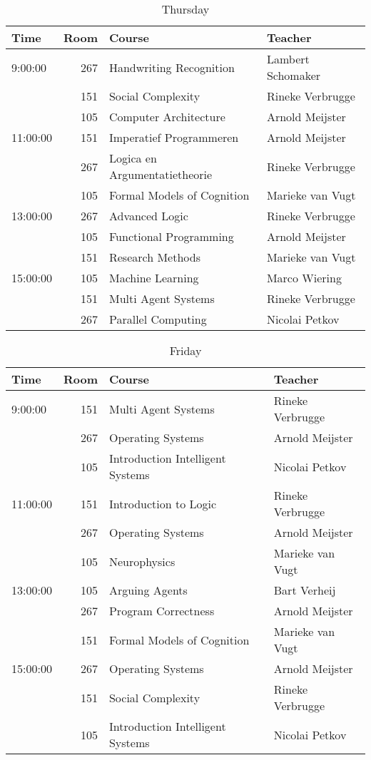 \begin{table}[h]
    \centering
    \caption{Thursday}
    \begin{tabular}{l|r|l|l}
        Time & Room & Course & Teacher \\ \hline
        \hline
        9:00:00 & 267 & Handwriting Recognition & Lambert Schomaker\\
        & 151 & Social Complexity & Rineke Verbrugge\\
        & 105 & Computer Architecture & Arnold Meijster\\\hline
        11:00:00 & 151 & Imperatief Programmeren & Arnold Meijster\\
        & 267 & Logica en Argumentatietheorie & Rineke Verbrugge\\
        & 105 & Formal Models of Cognition & Marieke van Vugt\\\hline
        13:00:00 & 267 & Advanced Logic & Rineke Verbrugge\\
        & 105 & Functional Programming & Arnold Meijster\\
        & 151 & Research Methods & Marieke van Vugt\\\hline
        15:00:00 & 105 & Machine Learning & Marco Wiering\\
        & 151 & Multi Agent Systems & Rineke Verbrugge\\
        & 267 & Parallel Computing & Nicolai Petkov\\
    \end{tabular}
\end{table}

\begin{table}[h]
    \centering
    \caption{Friday}
    \begin{tabular}{l|r|l|l}
        Time & Room & Course & Teacher \\ \hline
        \hline
        9:00:00 & 151 & Multi Agent Systems & Rineke Verbrugge\\
        & 267 & Operating Systems & Arnold Meijster\\
        & 105 & Introduction Intelligent Systems & Nicolai Petkov\\\hline
        11:00:00 & 151 & Introduction to Logic & Rineke Verbrugge\\
        & 267 & Operating Systems & Arnold Meijster\\
        & 105 & Neurophysics & Marieke van Vugt\\\hline
        13:00:00 & 105 & Arguing Agents & Bart Verheij\\
        & 267 & Program Correctness & Arnold Meijster\\
        & 151 & Formal Models of Cognition & Marieke van Vugt\\\hline
        15:00:00 & 267 & Operating Systems & Arnold Meijster\\
        & 151 & Social Complexity & Rineke Verbrugge\\
        & 105 & Introduction Intelligent Systems & Nicolai Petkov\\
    \end{tabular}
\end{table}



